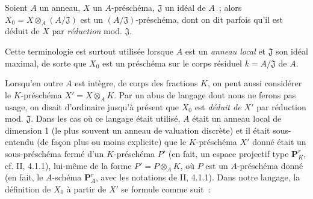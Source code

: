 \begin{env}[3.7.1]
\label{I.3.7.1-fr}
Soient $A$ un anneau, $X$ un $A$-préschéma, $\mathfrak{J}$ un idéal de $A$~;
alors $X_0=X\otimes_A(A/\mathfrak{J})$ est un
$(A/\mathfrak{J})$-préschéma, dont on dit parfois qu'il est déduit de $X$ par
\emph{réduction} mod. $\mathfrak{J}$.
\end{env}

\begin{env}[3.7.2]
\label{I.3.7.2-fr}
Cette terminologie est surtout utilisée lorsque $A$ est un \emph{anneau
local} et $\mathfrak{J}$ son idéal maximal, de sorte que $X_0$ est un
préschéma sur le corps résiduel $k=A/\mathfrak{J}$ de $A$.

Lorsqu'en outre $A$ est intègre, de corps des fractions $K$, on peut aussi
considérer le $K$-préschéma $X'=X\otimes_A K$. Par un abus de langage dont
nous ne ferons pas usage, on disait d'ordinaire jusqu'à présent que $X_0$ est
\emph{déduit de $X'$} par réduction mod. $\mathfrak{J}$. Dans les cas où ce
langage était utilisé, $A$ était un anneau local de dimension 1 (le plus
souvent un anneau de valuation discrète) et il était sous-entendu (de façon
plus ou moins explicite) que le $K$-préschéma $X'$ donné était un
sous-préschéma fermé d'un $K$-préschéma $P'$ (en fait, un espace projectif
type $\mathbf{P}_K^r$, cf. II, 4.1.1), lui-même de la forme
$P'=P\otimes_A K$, où $P$ est un $A$-préschéma donné (en fait, le $A$-schéma
$\mathbf{P}_A^r$, avec les notations de II, 4.1.1). Dans notre langage, la
définition de $X_0$ à partir de $X'$ se formule comme suit~:


\end{env}
